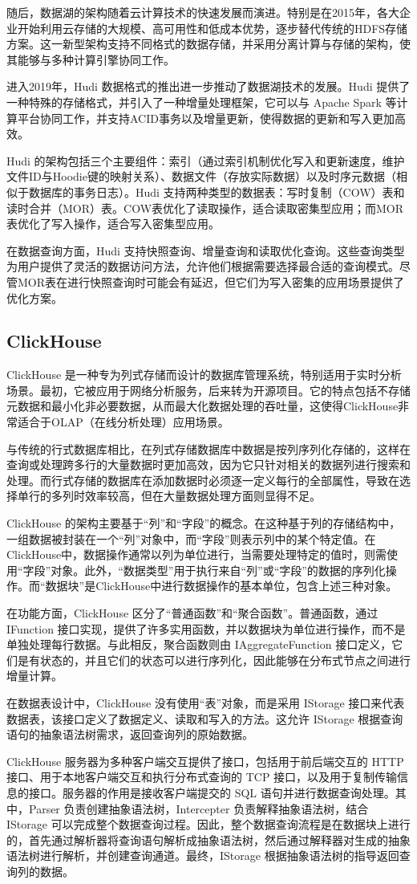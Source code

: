 随后，数据湖的架构随着云计算技术的快速发展而演进。特别是在2015年，各大企业开始利用云存储的大规模、高可用性和低成本优势，逐步替代传统的HDFS存储方案。这一新型架构支持不同格式的数据存储，并采用分离计算与存储的架构，使其能够与多种计算引擎协同工作。

进入2019年，Hudi 数据格式的推出进一步推动了数据湖技术的发展。Hudi 提供了一种特殊的存储格式，并引入了一种增量处理框架，它可以与 Apache Spark 等计算平台协同工作，并支持ACID事务以及增量更新，使得数据的更新和写入更加高效。

Hudi 的架构包括三个主要组件：索引（通过索引机制优化写入和更新速度，维护文件ID与Hoodie键的映射关系）、数据文件（存放实际数据）以及时序元数据（相似于数据库的事务日志）。Hudi 支持两种类型的数据表：写时复制（COW）表和读时合并（MOR）表。COW表优化了读取操作，适合读取密集型应用；而MOR表优化了写入操作，适合写入密集型应用。

在数据查询方面，Hudi 支持快照查询、增量查询和读取优化查询。这些查询类型为用户提供了灵活的数据访问方法，允许他们根据需要选择最合适的查询模式。尽管MOR表在进行快照查询时可能会有延迟，但它们为写入密集的应用场景提供了优化方案。
\subsection{ClickHouse}
ClickHouse 是一种专为列式存储而设计的数据库管理系统，特别适用于实时分析场景。最初，它被应用于网络分析服务，后来转为开源项目。它的特点包括不存储元数据和最小化非必要数据，从而最大化数据处理的吞吐量，这使得ClickHouse非常适合于OLAP（在线分析处理）应用场景。

与传统的行式数据库相比，在列式存储数据库中数据是按列序列化存储的，这样在查询或处理跨多行的大量数据时更加高效，因为它只针对相关的数据列进行搜索和处理。而行式存储的数据库在添加数据时必须逐一定义每行的全部属性，导致在选择单行的多列时效率较高，但在大量数据处理方面则显得不足。

ClickHouse 的架构主要基于“列”和“字段”的概念。在这种基于列的存储结构中，一组数据被封装在一个“列”对象中，而“字段”则表示列中的某个特定值。在ClickHouse中，数据操作通常以列为单位进行，当需要处理特定的值时，则需使用“字段”对象。此外，“数据类型”用于执行来自“列”或“字段”的数据的序列化操作。而“数据块”是ClickHouse中进行数据操作的基本单位，包含上述三种对象。

在功能方面，ClickHouse 区分了“普通函数”和“聚合函数”。普通函数，通过 IFunction 接口实现，提供了许多实用函数，并以数据块为单位进行操作，而不是单独处理每行数据。与此相反，聚合函数则由 IAggregateFunction 接口定义，它们是有状态的，并且它们的状态可以进行序列化，因此能够在分布式节点之间进行增量计算。

在数据表设计中，ClickHouse 没有使用“表”对象，而是采用 IStorage 接口来代表数据表，该接口定义了数据定义、读取和写入的方法。这允许 IStorage 根据查询语句的抽象语法树需求，返回查询列的原始数据。

ClickHouse 服务器为多种客户端交互提供了接口，包括用于前后端交互的 HTTP 接口、用于本地客户端交互和执行分布式查询的 TCP 接口，以及用于复制传输信息的接口。服务器的作用是接收客户端提交的 SQL 语句并进行数据查询处理。其中，Parser 负责创建抽象语法树，Intercepter 负责解释抽象语法树，结合 IStorage 可以完成整个数据查询过程。因此，整个数据查询流程是在数据块上进行的，首先通过解析器将查询语句解析成抽象语法树，然后通过解释器对生成的抽象语法树进行解析，并创建查询通道。最终，IStorage 根据抽象语法树的指导返回查询列的数据。